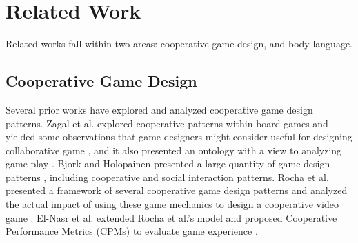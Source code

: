 \section{Related Work}

Related works fall within two areas: cooperative game design, and body language.

\subsection{Cooperative Game Design}



Several prior works have explored and analyzed cooperative game design patterns. Zagal et al. explored cooperative patterns within board games and yielded some observations that game designers might consider useful for designing collaborative game \cite{CG1}, and it also presented an ontology with a view to analyzing game play \cite{CG3}. 
Bjork and Holopainen presented a large quantity of game design patterns \cite{CG2}, including cooperative and social interaction patterns.
Rocha et al. presented a framework of several cooperative game design patterns and analyzed the actual impact of using these game mechanics to design a cooperative video game \cite{CG4}.
El-Nasr et al. extended Rocha et al.'s model and proposed Cooperative Performance Metrics (CPMs) to evaluate game experience \cite{CPMs}.


